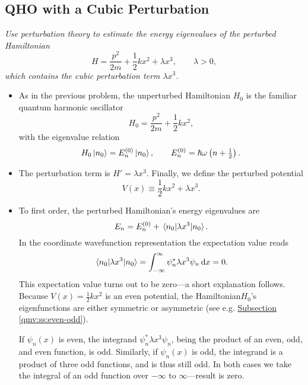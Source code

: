 \documentclass[11pt, a4paper]{article}
\newcommand{\diff}{\mathop{}\!\mathrm{d}} %
\newcommand{\Ham}{Hamiltonian\xspace}
\begin{document}
\subsection{QHO with a Cubic Perturbation}
\textit{Use perturbation theory to estimate the energy eigenvalues of the perturbed Hamiltonian}
\begin{equation*}
	H = \frac{p^{2}}{2m} + \frac{1}{2}kx^{2} + \lambda x^{3}, \qquad \lambda > 0,
\end{equation*}
\textit{which contains the cubic perturbation term $ \lambda x^{3} $.}
\begin{itemize}
	\item As in the previous problem, the unperturbed Hamiltonian $ H_{0} $ is the familiar quantum harmonic oscillator
	\begin{equation*}
		H_{0} = \frac{p^{2}}{2m} + \frac{1}{2}kx^{2},
	\end{equation*}
	with the eigenvalue relation
	\begin{equation*}
		H_{0}\ket{n_{0}} = E^{(0)}_{n} \ket{n_{0}}, \qquad E^{(0)}_{n} = \hbar \omega \left(n + \tfrac{1}{2}\right).
	\end{equation*}
	
	\item The perturbation term is $ H' = \lambda x^{3} $. Finally, we define the perturbed potential
	\begin{equation*}
		V(x) \equiv \frac{1}{2}kx^{2} + \lambda x^{3}.
	\end{equation*}
	
	\item To first order, the perturbed \Ham's energy eigenvalues are
	\begin{equation*}
		E_{n} = E^{(0)}_{n} + \mel{n_{0}}{\lambda x^{3}}{n_{0}}.
	\end{equation*}
	In the coordinate wavefunction representation the expectation value reads
	\begin{equation*}
		\mel{n_{0}}{\lambda x^{3}}{n_{0}} = \int_{-\infty}^{\infty}\psi_{n}^{*}\lambda x^{3}\psi_{n}\diff x = 0.
	\end{equation*}
	This expectation value turns out to be zero---a short explanation follows. Because $ V(x) = \frac{1}{2}kx^{2} $ is an even potential, the \Ham $ H_{0} $'s eigenfunctions are either symmetric or asymmetric (see e.g. \hyperref[qmv:ss:even-odd]{Subsection \ref{qmv:ss:even-odd}}).
	
	If $ \psi_{n}(x) $ is even, the integrand $ \psi_{n}^{*}\lambda x^{3}\psi_{n} $, being the product of an even, odd, and even function, is odd. Similarly, if $ \psi_{n}(x) $ is odd, the integrand is a product of three odd functions, and is thus still odd. In both cases we take the integral of an odd function over $ -\infty $ to $ \infty $---result is zero. 
	

\end{itemize}
\end{document}
